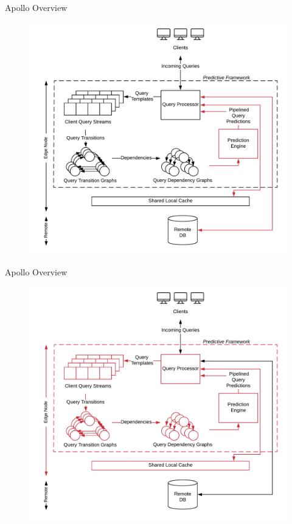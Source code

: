 \documentclass[10pt]{beamer}
\begin{document}
\begin{frame}[fragile]{Apollo Overview}
    \begin{figure}
        \hspace*{-1cm}
        \includegraphics[scale=0.13]{apollo_overview_5}
    \end{figure}
\end{frame}

\begin{frame}[fragile]{Apollo Overview}
    \begin{figure}
        \hspace*{-1cm}
        \includegraphics[scale=0.13]{apollo_overview_6}
    \end{figure}
\end{frame}
\end{document}
